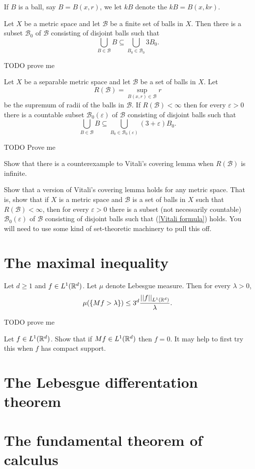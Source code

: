 \begin{definition}
If $B$ is a ball, say $B = B(x, r)$, we let $kB$ denote the  $kB = B(x, kr)$.
\end{definition}
\begin{lemma}
Let $X$ be a metric space and let $\mathcal B$ be a finite set of balls in $X$. Then there is a subset $\mathcal B_{0}$ of $\mathcal B$ consisting of disjoint balls such that
\[\bigcup_{B \in \mathcal B} B \subseteq \bigcup_{B_{0} \in \mathcal B_{0}} 3B_{0}.\]
\end{lemma}
TODO prove me
\begin{theorem}
Let $X$ be a separable metric space and let $\mathcal B$ be a set of balls in $X$. Let
\[R(\mathcal B) = \sup_{B(x, r) \in \mathcal B} r\]
be the supremum of radii of the balls in $\mathcal B$. If $R(\mathcal B) < \infty$ then for every $\varepsilon > 0$ there is a countable subset $\mathcal B_{0}(\varepsilon)$ of $\mathcal B$ consisting of disjoint balls such that
\begin{equation}\label{Vitali formula}
\bigcup_{B \in \mathcal B} B \subseteq \bigcup_{B_{0} \in \mathcal B_{0}(\varepsilon)} (3 + \varepsilon)B_{0}.
\end{equation}
\end{theorem}
TODO Prove me

\begin{exercise}
Show that there is a counterexample to Vitali's covering lemma when $R(\mathcal B)$ is infinite.
\end{exercise}

\begin{exercise}
Show that a version of Vitali's covering lemma holds for any metric space.
That is, show that if $X$ is a metric space and $\mathcal B$ is a set of balls in $X$ such that $R(\mathcal B) < \infty$, then for every $\varepsilon > 0$ there is a subset (not necessarily countable) $\mathcal B_{0}(\varepsilon)$ of $\mathcal B$ consisting of disjoint balls such that (\ref{Vitali formula}) holds.
You will need to use some kind of set-theoretic machinery to pull this off.
\end{exercise}

\section{The maximal inequality}

\begin{theorem}
Let $d \geq 1$ and $f \in L^{1}(\mathbb{R}^{d})$. Let $\mu$ denote Lebesgue measure. Then for every $\lambda > 0$,
\[\mu(\{Mf > \lambda\}) \leq 3^{d} \frac{||f||_{L^{1}(\mathbb{R}^{d})}}{\lambda}.\]
\end{theorem}
TODO prove me

\begin{exercise}
Let $f \in L^{1}(\mathbb{R}^{d})$.
Show that if $Mf \in L^{1}(\mathbb{R}^{d})$ then $f = 0$.
It may help to first try this when $f$ has compact support.
\end{exercise}

\section{The Lebesgue differentation theorem}

\section{The fundamental theorem of calculus}
